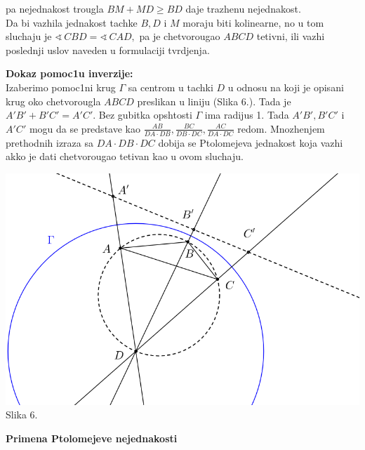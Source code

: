 \documentclass[11pt,letter]{report}
\def\ug{\mathbin{\sphericalangle\,}}
\newcommand{\D}{\displaystyle}
\begin{document}
pa nejednakost trougla $BM+MD\geq BD$ daje trazhenu nejednakost.\\

Da bi vazhila  jednakost tachke $B,D$ i $M$ moraju biti kolinearne, no u tom sluchaju je $\ug CBD=\ug CAD,$ pa je chetvorougao $ABCD$ tetivni, ili vazhi poslednji uslov naveden u formulaciji tvrdjenja.

\begin{flushleft}
\textbf{Dokaz pomoc1u inverzije:}\\
Izaberimo pomoc1ni krug $\Gamma$  sa centrom u tachki $D$ u odnosu na koji je opisani krug oko chetvorougla $ABCD$ preslikan u liniju (Slika 6.). Tada je ${\D A'B'+B'C'=A'C'.}$ Bez gubitka opshtosti $\Gamma$ ima radijus 1. Tada ${\D A'B',B'C'}$ i ${\D A'C'}$ mogu da se predstave kao ${\D {\frac {AB}{DA\cdot DB}},{\D\frac {BC}{DB\cdot DC}},{\D\frac {AC}{DA\cdot DC}}}$ redom. Mnozhenjem prethodnih izraza sa ${\D DA\cdot DB\cdot DC}$ dobija se Ptolomejeva jednakost koja vazhi akko je dati chetvorougao tetivan kao u ovom sluchaju.
\end{flushleft}
\centering
\includegraphics[scale=0.3]{Slike/Ptolomej.png}\\
\small Slika 6.
\newpage
\vspace*{-1in}
\large \begin{center}
\LARGE \textbf{Primena Ptolomejeve nejednakosti}
\end{center}
\end{document}
